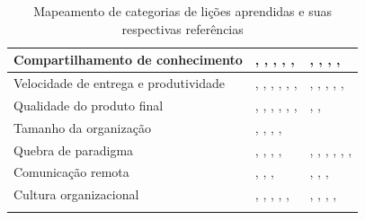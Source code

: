 \begin{table}[H]
\begin{tabularx}{\linewidth}{ | p{6cm} | X | X | }
		\hline 
		Compartilhamento de conhecimento & \cite{Asnawi2012}, \cite{Cisco2011}, \cite{Lapham2012}, \cite{Radha2012}, \cite{Eunha2012}, \cite{Ericsson2013} & \cite{Valerio2013}, \cite{Vieira2013}, \cite{Queiroz2013}, \cite{Bastos2013}, \cite{Maciel2013} \\ 
		\hline 
		Velocidade de entrega e produtividade & \cite{Adobe2012}, \cite{Fitzgerald2013}, \cite{Microsoft2013}, \cite{Cisco2011}, \cite{Korhonen2010}, \cite{Eunha2012}, \cite{Claudia2013} & \cite{Stefano2013}, \cite{Queiroz2013}, \cite{Maciel2013}, \cite{Hui2013}, \cite{Ahmed2008}, \cite{Piegas2012} \\ 
		\hline 
		Qualidade do produto final & \cite{Adobe2012}, \cite{Fitzgerald2013}, \cite{Bustard2013}, \cite{Lapham2012}, \cite{Eunha2012}, \cite{Claudia2013}, \cite{Korhonen2010} & \cite{Parzinello2012}, \cite{Maciel2013}, \cite{Ahmed2008} \\ 
		\hline 
		Tamanho da organização & \cite{Bustard2013}, \cite{Microsoft2013}, \cite{Claudia2013}, \cite{Korhonen2010}, \cite{Ericsson2013} & \cite{Maciel2013} \\ 
		\hline 
		Quebra de paradigma & \cite{Hajjdiab2011}, \cite{Block2011}, \cite{Korhonen2010}, \cite{Lapham2012}, \cite{Arikpo2011} & \cite{Stefano2013}, \cite{Bastos2013}, \cite{Maciel2013}, \cite{Parzinello2012}, \cite{Hui2013}, \cite{Ahmed2008}, \cite{Sahota2012} \\ 
		\hline 
		Comunicação remota & \cite{Adobe2012}, \cite{Microsoft2013}, \cite{Korhonen2010}, \cite{Radha2012} & \cite{Rodrigues2013}, \cite{Vieira2013}, \cite{Bastos2013}, \cite{Maciel2013} \\ 
		\hline 
		Cultura organizacional & \cite{Bustard2013}, \cite{Microsoft2013}, \cite{Claudia2013}, \cite{Nokia2013}, \cite{Eunha2012}, \cite{Fitzgerald2013} & \cite{Rodrigues2013}, \cite{Bastos2013}, \cite{Srinath2012}, \cite{Maciel2013}, \cite{Sahota2012} \\ 
		\hline 
	\caption{Mapeamento de categorias de lições aprendidas e suas respectivas referências}
	\label{tab:mapeamentoCategorias}
	\end{tabularx}
\end{table}

